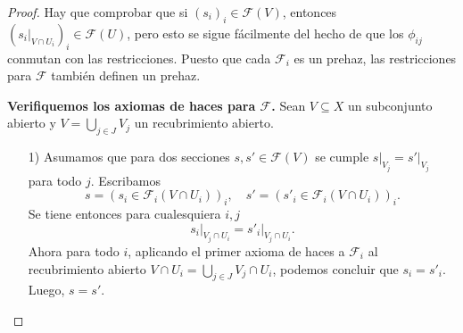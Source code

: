 \documentclass{article}
\numberwithin{equation}{section}
\theoremstyle{definition}
\begin{document}
\begin{proof}
  Hay que comprobar que si $(s_i)_i \in \mathcal{F} (V)$, entonces
  $(s_i|_{V \cap U_i})_i \in \mathcal{F} (U)$, pero esto se sigue fácilmente
  del hecho de que los $\phi_{ij}$ conmutan con las restricciones. Puesto que
  cada $\mathcal{F}_i$ es un prehaz, las restricciones para $\mathcal{F}$
  también definen un prehaz.


  \vspace{1em}

  \textbf{Verifiquemos los axiomas de haces para $\mathcal{F}$.} Sean
  $V \subseteq X$ un subconjunto abierto y $V = \bigcup_{j\in J} V_j$
  un recubrimiento abierto.


  \begin{enumerate}
  \item[1)] Asumamos que para dos secciones $s, s' \in \mathcal{F} (V)$
    se cumple $\left.s\right|_{V_j} = \left.s'\right|_{V_j}$ para todo
    $j$. Escribamos
    $$s = (s_i \in \mathcal{F}_i (V \cap U_i))_i, \quad s' = (s'_i \in \mathcal{F}_i (V \cap U_i))_i.$$
    Se tiene entonces para cualesquiera $i,j$
    $$\left.s_i\right|_{V_j \cap U_i} = \left.s'_i\right|_{V_j \cap U_i}.$$
    Ahora para todo $i$, aplicando el primer axioma de haces a $\mathcal{F}_i$
    al recubrimiento abierto ${V \cap U_i = \bigcup_{j\in J} V_j \cap U_i}$,
    podemos concluir que $s_i = s'_i$. Luego, $s = s'$.


\end{enumerate}
\end{proof}
\end{document}
